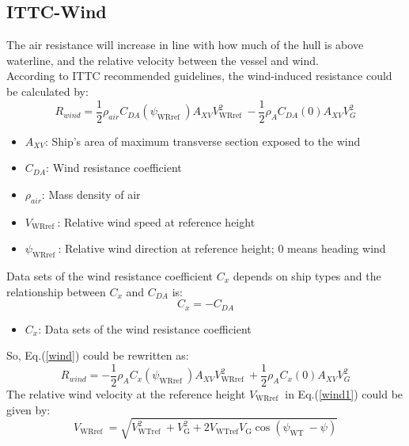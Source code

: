 \subsection{ITTC-Wind}
\label{sec:ITTC}
The air resistance will increase in line with how much of the hull is above waterline, and the relative velocity between the vessel and wind.
\\According to ITTC recommended guidelines\cite{2017ITTC}, the wind-induced resistance could be calculated by:
\begin{equation}
    R_{wind}=\frac{1}{2} \rho_{air} C_{D A}\left(\psi_{\text {WRref }}\right) A_{X V} V_{\text {WRref }}^{2}-\frac{1}{2} \rho_{A} C_{D A}(0) A_{X V} V_{G}^{2}
    \label{wind}
\end{equation}
\begin{itemize}
    \item $A_{XV}$: Ship's area of maximum transverse section exposed to the wind
    \item $C_{D A}$: Wind resistance coefficient
    \item $\rho_{air}$: Mass density of air
    \item $V_{\text {WRref }}$: Relative wind speed at reference height
    \item $\psi_{\text {WRref }}$: Relative wind direction at reference height; 0 means heading wind
\end{itemize}
Data sets of the wind resistance coefficient $C_{x}$ depends on ship types and the relationship between $C_{x}$ and $C_{D A}$ is:
\begin{equation*}
    C_{x}=-C_{D A}
\end{equation*}
\begin{itemize}
    \item $C_{x}$: Data sets of the wind resistance coefficient
\end{itemize}
So, Eq.(\ref{wind}) could be rewritten as:
\begin{equation}
    R_{wind}=-\frac{1}{2} \rho_{A} C_{x}\left(\psi_{\text {WRref }}\right) A_{X V} V_{\text {WRref }}^{2}+\frac{1}{2} \rho_{A} C_{x}(0) A_{X V} V_{G}^{2}
    \label{wind1}
\end{equation}
The relative wind velocity at the reference height $V_{\text {WRref }}$ in Eq.(\ref{wind1}) could be given by:
\begin{equation*}
    V_{\text {WRref }}=\sqrt{V_{\text {WTref }}^{2}+V_{\mathrm{G}}^{2}+2 V_{\text {WTref}} V_{\mathrm{G}} \cos \left(\psi_{\text {WT }}-\psi\right)}
\end{equation*}
